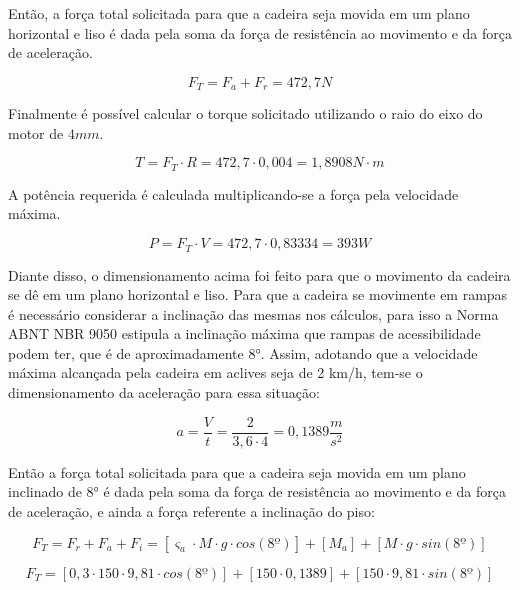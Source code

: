 Então, a força total solicitada para que a cadeira seja movida 
em um plano 
horizontal e liso é dada pela soma da força de resistência ao 
movimento e da força de aceleração.

\begin{equation}
F_{T} = F_{a} + F_{r} = 472,7 N
\end{equation}

Finalmente é possível calcular o torque solicitado utilizando o raio do eixo do
motor de $4mm$.

\begin{equation}
T = F_{T} \cdot R = 472,7 \cdot 0,004 = 1,8908 N\cdot m
\end{equation}

A potência requerida é calculada multiplicando-se a força pela velocidade máxima.

\begin{equation}
P = F_{T} \cdot V = 472,7 \cdot 0,83334 = 393 W
\end{equation}

Diante disso, o dimensionamento acima foi feito para que o 
movimento da cadeira se dê em um plano horizontal e liso. 
Para que a cadeira se movimente em rampas é necessário considerar 
a inclinação das mesmas nos cálculos, para isso a Norma ABNT NBR 9050 
estipula a inclinação máxima que rampas de acessibilidade 
podem ter, que é de aproximadamente 8°. Assim, adotando que a velocidade 
máxima alcançada pela cadeira em aclives seja de 2 km/h, tem-se o 
dimensionamento da aceleração para essa situação: 

\begin{equation}
a = \frac{V}{t} = \frac{2}{3,6 \cdot 4} = 0,1389 \frac{m}{s^2}
\end{equation}

Então a força total solicitada para que a cadeira seja movida 
em um plano inclinado de 8° é dada pela soma da força de resistência 
ao movimento e da força de aceleração, e ainda a força referente a inclinação do piso:

\begin{equation}
F_{T} = F_{r} + F_{a} + F_{i} = [\varsigma_{a} \cdot M \cdot g \cdot cos(8º)] + [M_{a}] + [M \cdot g \cdot sin(8º)]
\end{equation}

\begin{equation}
F_{T} = [0,3 \cdot 150 \cdot 9,81 \cdot cos(8º)] + [150 \cdot 0,1389] + [150 \cdot 9,81 \cdot sin(8º)]
\end{equation}

